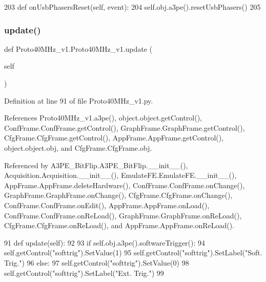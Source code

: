 \begin{DoxyCode}
203     \textcolor{keyword}{def }onUsbPhasersReset(self, event):
204         self.obj.a3pe().resetUsbPhasers()
205 
\end{DoxyCode}
\mbox{\label{classProto40MHz__v1_1_1Proto40MHz__v1_af042406a0a21ee5721f6513a98d847b0}} 
\subsubsection{\texorpdfstring{update()}{update()}}
{\footnotesize\ttfamily def Proto40\+M\+Hz\+\_\+v1.\+Proto40\+M\+Hz\+\_\+v1.\+update (\begin{DoxyParamCaption}\item[{}]{self }\end{DoxyParamCaption})}



Definition at line 91 of file Proto40\+M\+Hz\+\_\+v1.\+py.



References Proto40\+M\+Hz\+\_\+v1.\+a3pe(), object.\+object.\+get\+Control(), Conf\+Frame.\+Conf\+Frame.\+get\+Control(), Graph\+Frame.\+Graph\+Frame.\+get\+Control(), Cfg\+Frame.\+Cfg\+Frame.\+get\+Control(), App\+Frame.\+App\+Frame.\+get\+Control(), object.\+object.\+obj, and Cfg\+Frame.\+Cfg\+Frame.\+obj.



Referenced by A3\+P\+E\+\_\+\+Bit\+Flip.\+A3\+P\+E\+\_\+\+Bit\+Flip.\+\_\+\+\_\+init\+\_\+\+\_\+(), Acquisition.\+Acquisition.\+\_\+\+\_\+init\+\_\+\+\_\+(), Emulate\+F\+E.\+Emulate\+F\+E.\+\_\+\+\_\+init\+\_\+\+\_\+(), App\+Frame.\+App\+Frame.\+delete\+Hardware(), Conf\+Frame.\+Conf\+Frame.\+on\+Change(), Graph\+Frame.\+Graph\+Frame.\+on\+Change(), Cfg\+Frame.\+Cfg\+Frame.\+on\+Change(), Conf\+Frame.\+Conf\+Frame.\+on\+Edit(), App\+Frame.\+App\+Frame.\+on\+Load(), Conf\+Frame.\+Conf\+Frame.\+on\+Re\+Load(), Graph\+Frame.\+Graph\+Frame.\+on\+Re\+Load(), Cfg\+Frame.\+Cfg\+Frame.\+on\+Re\+Load(), and App\+Frame.\+App\+Frame.\+on\+Re\+Load().


\begin{DoxyCode}
91     \textcolor{keyword}{def }update(self):
92         
93         \textcolor{keywordflow}{if} self.obj.a3pe().softwareTrigger():
94             self.getControl(\textcolor{stringliteral}{"softtrig"}).SetValue(1)
95             self.getControl(\textcolor{stringliteral}{"softtrig"}).SetLabel(\textcolor{stringliteral}{"Soft. Trig."})
96         \textcolor{keywordflow}{else}:
97             self.getControl(\textcolor{stringliteral}{"softtrig"}).SetValue(0)
98             self.getControl(\textcolor{stringliteral}{"softtrig"}).SetLabel(\textcolor{stringliteral}{"Ext. Trig."})
99             
\end{DoxyCode}


